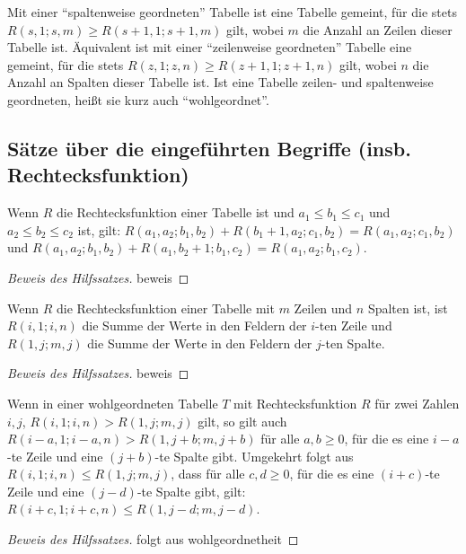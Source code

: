 \begin{definition}
    Mit einer "`spaltenweise geordneten"' Tabelle ist eine Tabelle gemeint, für die stets $R(s, 1; s, m)\geq 
    R(s+1, 1; s+1, m)$ gilt, wobei $m$ die Anzahl an Zeilen dieser Tabelle ist. Äquivalent ist mit einer 
    "`zeilenweise geordneten"' Tabelle eine gemeint, für die stets $R(z, 1; z, n)\geq R(z+1, 1; z+1, n)$ gilt, 
    wobei $n$ die Anzahl an Spalten dieser Tabelle ist. Ist eine Tabelle zeilen- und spaltenweise geordneten, heißt 
    sie kurz auch "`wohlgeordnet"'.
\end{definition}

\subsection*{Sätze über die eingeführten Begriffe (insb. Rechtecksfunktion)}

\renewcommand{\qedsymbol}{$\square$}

\begin{lem}\label{r_summe}
    Wenn $R$ die Rechtecksfunktion einer Tabelle ist und $a_1\leq b_1\leq c_1$ und $a_2\leq b_2\leq c_2$ ist, gilt: 
    $R(a_1, a_2; b_1, b_2)+R(b_1+1, a_2; c_1, b_2)=R(a_1, a_2; c_1, b_2)$ und 
    $R(a_1, a_2; b_1, b_2)+R(a_1, b_2+1; b_1, c_2)=R(a_1, a_2; b_1, c_2)$.
\end{lem}
\begin{proof}[Beweis des Hilfssatzes]
    beweis
\end{proof}
\begin{lem}\label{r_zeile_spalte}
    Wenn $R$ die Rechtecksfunktion einer Tabelle mit $m$ Zeilen und $n$ Spalten ist, ist $R(i, 1; i, n)$ die Summe 
    der Werte in den Feldern der $i$-ten Zeile und $R(1, j; m, j)$ die Summe der Werte in den Feldern der $j$-ten 
    Spalte.
\end{lem}
\begin{proof}[Beweis des Hilfssatzes]
    beweis
\end{proof}
\begin{lem}\label{mehr_nuller}
    Wenn in einer wohlgeordneten Tabelle $T$ mit Rechtecksfunktion $R$ für zwei Zahlen $i, j$, $R(i, 1; i, n)>
    R(1, j; m, j)$ gilt, so gilt auch $R(i-a, 1; i-a, n)>R(1, j+b; m, j+b)$ für alle $a, b\geq0$, für die es eine 
    $i-a$-te Zeile und eine $(j+b)$-te Spalte gibt. Umgekehrt folgt aus $R(i, 1; i, n)\leq R(1, j; m, j)$, dass für 
    alle $c,d\geq0$, für die es eine $(i+c)$-te Zeile und  eine $(j-d)$-te Spalte gibt, gilt: $R(i+c, 1; i+c, n)\leq 
    R(1, j-d; m, j-d)$. 
\end{lem}
\begin{proof}[Beweis des Hilfssatzes]
    folgt aus wohlgeordnetheit %
\end{proof}

